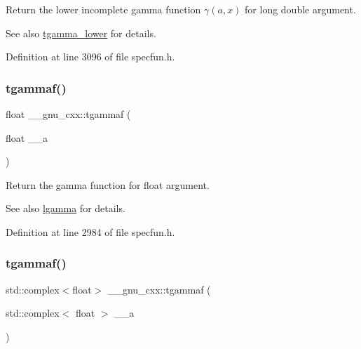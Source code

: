Return the lower incomplete gamma function $ \gamma(a,x) $ for {\ttfamily long double} argument.

\begin{DoxySeeAlso}{See also}
\hyperlink{group__gnu__math__spec__func_gaed107908dec8865ea48e7764f7ea88a2}{tgamma\+\_\+lower} for details. 
\end{DoxySeeAlso}


Definition at line 3096 of file specfun.\+h.

\mbox{\label{group__gnu__math__spec__func_ga008b1f4cc3a54c9c8221ad1f3504b593}} 
\subsubsection{\texorpdfstring{tgammaf()}{tgammaf()}\hspace{0.1cm}{\footnotesize\ttfamily [1/3]}}
{\footnotesize\ttfamily float \+\_\+\+\_\+gnu\+\_\+cxx\+::tgammaf (\begin{DoxyParamCaption}\item[{float}]{\+\_\+\+\_\+a }\end{DoxyParamCaption})\hspace{0.3cm}{\ttfamily [inline]}}

Return the gamma function for {\ttfamily  float } argument.

\begin{DoxySeeAlso}{See also}
\hyperlink{group__gnu__math__spec__func_ga40fa5127f7c419ed1d8f1c6a6f96ea9b}{lgamma} for details. 
\end{DoxySeeAlso}


Definition at line 2984 of file specfun.\+h.

\mbox{\label{group__gnu__math__spec__func_gaf548b80db1501cbc067de1564e721972}} 
\subsubsection{\texorpdfstring{tgammaf()}{tgammaf()}\hspace{0.1cm}{\footnotesize\ttfamily [2/3]}}
{\footnotesize\ttfamily std\+::complex$<$float$>$ \+\_\+\+\_\+gnu\+\_\+cxx\+::tgammaf (\begin{DoxyParamCaption}\item[{std\+::complex$<$ float $>$}]{\+\_\+\+\_\+a }\end{DoxyParamCaption})\hspace{0.3cm}{\ttfamily [inline]}}

